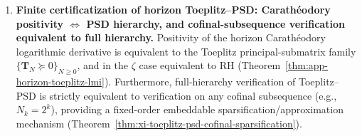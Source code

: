 \begin{enumerate}
  \item \textbf{Finite certificatization of horizon Toeplitz--PSD: Carath\'eodory positivity \texorpdfstring{$\Leftrightarrow$}{<->} PSD hierarchy, and cofinal-subsequence verification equivalent to full hierarchy.}
  Positivity of the horizon Carath\'eodory logarithmic derivative is equivalent to the Toeplitz principal-submatrix family \(\{\mathbf{T}_N\succeq 0\}_{N\ge 0}\), and in the \(\zeta\) case equivalent to RH (Theorem~\ref{thm:app-horizon-toeplitz-lmi}).
  Furthermore, full-hierarchy verification of Toeplitz--PSD is strictly equivalent to verification on any cofinal subsequence (e.g., \(N_k=2^k\)), providing a fixed-order embeddable sparsification/approximation mechanism (Theorem~\ref{thm:xi-toeplitz-psd-cofinal-sparsification}).
\end{enumerate}

